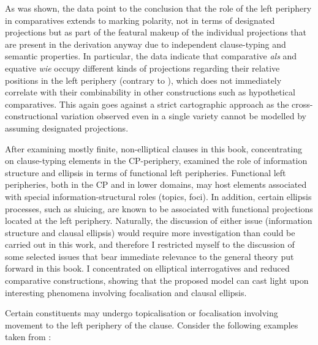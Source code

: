 \ea \label{germanch7}
\z
\z

As was shown, the data point to the conclusion that the role of the left periphery in comparatives extends to marking polarity, not in terms of designated projections but as part of the featural makeup of the individual projections that are present in the derivation anyway due to independent clause-typing and semantic properties. In particular, the data indicate that comparative \textit{als} and equative \textit{wie} occupy different kinds of projections regarding their relative positions in the left periphery (contrary to \citealt{jaeger2018}), which does not immediately correlate with their combinability in other constructions such as hypothetical comparatives. This again goes against a strict cartographic approach as the cross-constructional variation observed even in a single variety cannot be modelled by assuming designated projections.

After examining mostly finite, non-elliptical clauses in this book, concentrating on clause-typing elements in the CP-periphery,  examined the role of information structure and ellipsis in terms of functional left peripheries. Functional left peripheries, both in the CP and in lower domains, may host elements associated with special information-structural roles (topics, foci). In addition, certain ellipsis processes, such as sluicing, are known to be associated with functional projections located at the left periphery. Naturally, the discussion of either issue (information structure and clausal ellipsis) would require more investigation than could be carried out in this work, and therefore I restricted myself to the discussion of some selected issues that bear immediate relevance to the general theory put forward in this book. I concentrated on elliptical interrogatives and reduced comparative constructions, showing that the proposed model can cast light upon interesting phenomena involving focalisation and clausal ellipsis.

\begin{sloppypar}
Certain constituents may undergo topicalisation or focalisation involving movement to the left periphery of the clause. Consider the following examples taken from \citet[285, ex. 1 and 2]{rizzi1997}:
\end{sloppypar}

